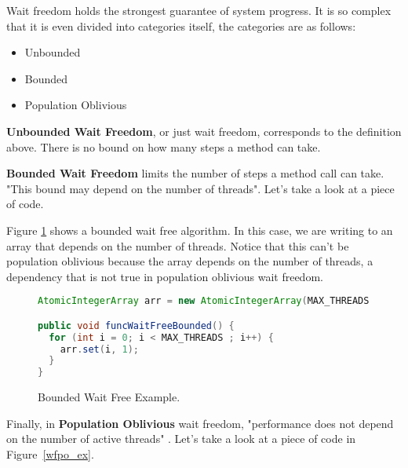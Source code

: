 \documentclass[letterpaper, 11pt]{article}
\begin{document}
Wait freedom holds the strongest guarantee of system progress. It is so complex that it is 
even divided into categories itself, the categories are as follows:

\begin{itemize}
  \item Unbounded
  \item Bounded
  \item Population Oblivious
\end{itemize}
\newpage

{\bfseries Unbounded Wait Freedom}, or just wait freedom, corresponds to the definition above. There is no bound on how many steps a method can take. 

\par\vspace{\baselineskip}

{\bfseries Bounded Wait Freedom} limits the number of steps a method call can take. "This bound 
may depend on the number of threads"\citep[p. 59]{artofmulti}. Let's take a look at a 
piece of code. 
\par\vspace{\baselineskip}

Figure \ref{boundedwaitfree_ex} shows a bounded wait free algorithm. 
In this case, we are writing to an array that depends on the number of threads. Notice that this can't be 
population oblivious because the array depends on the number of threads, a dependency that is not 
true in population oblivious wait freedom.
\par\vspace{\baselineskip}

\begin{figure}[H]
\begin{lstlisting}[language=Java]
AtomicIntegerArray arr = new AtomicIntegerArray(MAX_THREADS);

public void funcWaitFreeBounded() {
  for (int i = 0; i < MAX_THREADS ; i++) {
    arr.set(i, 1);
  }
}
\end{lstlisting}
\caption{Bounded Wait Free Example.\citep{concurrencyfreaks}} \label{boundedwaitfree_ex}
\end{figure}
 

Finally, in {\bfseries Population Oblivious} wait freedom, "performance does not depend on the 
number of active threads" \citep[p. 59]{artofmulti}. Let's take a look at a piece of code in
Figure~\ref{wfpo_ex}.
\par\vspace{\baselineskip}
\end{document}

